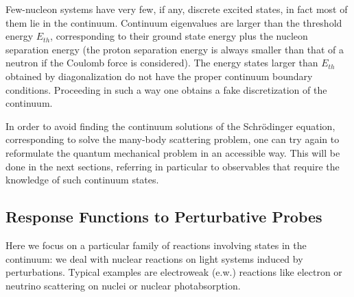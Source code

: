 Few-nucleon systems have very few, if any, discrete excited states, in fact most of them lie 
in the continuum. Continuum eigenvalues 
are larger than the threshold energy $E_{th}$, corresponding to their ground state energy plus
the nucleon separation energy (the proton separation energy 
is always smaller than that of a neutron if the Coulomb force is considered). 
The  energy states larger than $E_{th}$ obtained by diagonalization do not have the proper 
continuum boundary conditions. 
Proceeding in such a way one obtains a fake discretization of the continuum. 

In order to avoid finding the continuum solutions of the Schr\"odinger equation, corresponding to 
solve the many-body scattering problem,
one can try again to reformulate the quantum mechanical problem in an accessible way.
This will be done in the next sections,  referring in  particular to observables that require the knowledge  of such continuum states.

\subsection{Response Functions to Perturbative Probes}\label{sec:RPP}

Here we focus on a particular family of reactions involving states in the continuum: we deal with nuclear reactions on light systems 
induced by perturbations. Typical examples are electroweak (e.w.) reactions like electron or neutrino scattering on nuclei or 
nuclear photabsorption.

